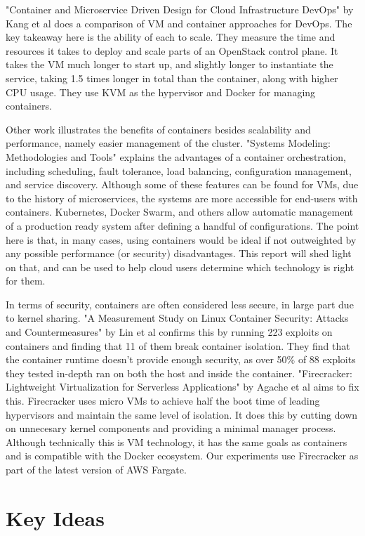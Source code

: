 \documentclass[11pt]{article}
\begin{document}
"Container and Microservice Driven Design for Cloud Infrastructure DevOps" by Kang et al does a comparison of VM and container approaches for DevOps. The key takeaway here is the ability of each to scale. They measure the time and resources it takes to deploy and scale parts of an OpenStack control plane. It takes the VM much longer to start up, and slightly longer to instantiate the service, taking 1.5 times longer in total than the container, along with higher CPU usage. They use KVM as the hypervisor and Docker for managing containers.

Other work illustrates the benefits of containers besides scalability and performance, namely easier management of the cluster. "Systems Modeling: Methodologies and Tools" explains the advantages of a container orchestration, including scheduling, fault tolerance, load balancing, configuration management, and service discovery. Although some of these features can be found for VMs, due to the history of microservices, the systems are more accessible for end-users with containers. Kubernetes, Docker Swarm, and others allow automatic management of a production ready system after defining a handful of configurations. The point here is that, in many cases, using containers would be ideal if not outweighted by any possible performance (or security) disadvantages. This report will shed light on that, and can be used to help cloud users determine which technology is right for them.

In terms of security, containers are often considered less secure, in large part due to kernel sharing. "A Measurement Study on Linux Container Security: Attacks and
Countermeasures" by Lin et al confirms this by running 223 exploits on containers and finding that 11 of them break container isolation. They find that the container runtime doesn't provide enough security, as over 50\% of 88 exploits they tested in-depth ran on both the host and inside the container. "Firecracker: Lightweight Virtualization
for Serverless Applications" by Agache et al aims to fix this. Firecracker uses micro VMs to achieve half the boot time of leading hypervisors and maintain the same level of isolation. It does this by cutting down on unnecesary kernel components and providing a minimal manager process. Although technically this is VM technology, it has the same goals as containers and is compatible with the Docker ecosystem. Our experiments use Firecracker as part of the latest version of AWS Fargate.


\section{Key Ideas}
\end{document}
